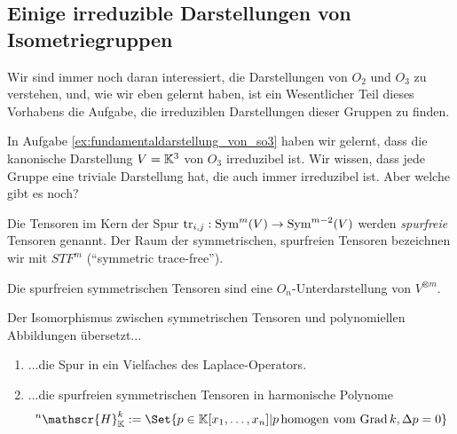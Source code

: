 \subsection{Einige irreduzible Darstellungen von Isometriegruppen}

\begin{remark}
Wir sind immer noch daran interessiert, die Darstellungen von $O_2$ und $O_3$ zu verstehen, und, wie wir eben gelernt haben, ist ein Wesentlicher Teil dieses Vorhabens die Aufgabe, die irreduziblen Darstellungen dieser Gruppen zu finden.

In Aufgabe \ref{ex:fundamentaldarstellung_von_so3} haben wir gelernt, dass die kanonische Darstellung $V=\mathbb{K}^3$ von $O_3$ irreduzibel ist. Wir wissen, dass jede Gruppe eine triviale Darstellung hat, die auch immer irreduzibel ist. Aber welche gibt es noch?
\end{remark}

\begin{definition}
Die Tensoren im Kern der Spur $\operatorname{tr}_{i,j} : \operatorname{Sym}^m(V) \to \operatorname{Sym}^{m-2}(V)$ werden \emph{spurfreie} Tensoren genannt. Der Raum der symmetrischen, spurfreien Tensoren bezeichnen wir mit $STF^m$ (\enquote{symmetric trace-free}).
\end{definition}

\begin{lemma}
Die spurfreien symmetrischen Tensoren sind eine $O_n$-Unterdarstellung von $V^{\otimes m}$.
\end{lemma}

\begin{lemma}
Der Isomorphismus zwischen symmetrischen Tensoren und polynomiellen Abbildungen übersetzt...
\begin{enumerate}
\item ...die Spur in ein Vielfaches des Laplace-Operators.
\item ...die spurfreien symmetrischen Tensoren in harmonische Polynome
\[{^n}\mathscr{H}_\IK^k := \Set{p\in\IK[x_1,\ldots,x_n] | p\,\text{homogen vom Grad}\,k, \Delta p=0}\]
\end{enumerate}
\end{lemma}

